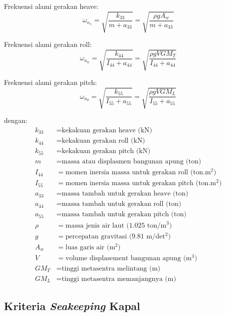 Frekuensi alami gerakan heave:
\begin{equation}
    \omega_{n_z} = \sqrt{\frac{k_{33}}{m + a_{33}}} = \sqrt{\frac{\rho g A_w}{m + a_{33}}}
\label{eq:heave-alami}
\end{equation}

Frekuensi alami gerakan roll:
\begin{equation}
    \omega_{n_\phi} = \sqrt{\frac{k_{44}}{I_{44} + a_{44}}} = \sqrt{\frac{\rho g V GM_T}{I_{44} + a_{44}}}
\label{eq:roll-alami}
\end{equation}

Frekuensi alami gerakan pitch:
\begin{equation}
    \omega_{n_\theta} = \sqrt{\frac{k_{55}}{I_{55} + a_{55}}} = \sqrt{\frac{\rho g V GM_L}{I_{55} + a_{55}}}
\label{eq:pitch-alami}
\end{equation}

dengan:
\begin{align*}
k_{33} & = \text{kekakuan gerakan heave (kN)} \\
k_{44} & = \text{kekakuan gerakan roll (kN)} \\
k_{55} & = \text{kekakuan gerakan pitch (kN)} \\
m & = \text{massa atau displasmen bangunan apung (ton)} \\
I_{44} & = \text{momen inersia massa untuk gerakan roll (ton.m$^2$)} \\
I_{55} & = \text{momen inersia massa untuk gerakan pitch (ton.m$^2$)} \\
a_{33} & = \text{massa tambah untuk gerakan heave (ton)} \\
a_{44} & = \text{massa tambah untuk gerakan roll (ton)} \\
a_{55} & = \text{massa tambah untuk gerakan pitch (ton)} \\
\rho & = \text{massa jenis air laut (1.025 ton/m$^3$)} \\
g & = \text{percepatan gravitasi (9.81 m/det$^2$)} \\
A_w & = \text{luas garis air (m$^2$)} \\
V & = \text{volume displasement bangunan apung (m$^3$)} \\
GM_T & = \text{tinggi metasentra melintang (m)} \\
GM_L & = \text{tinggi metasentra memanjangnya (m)}
\end{align*}

\subsection{Kriteria \emph{Seakeeping} Kapal}
\label{subsec:kriteria-seakeeping}

